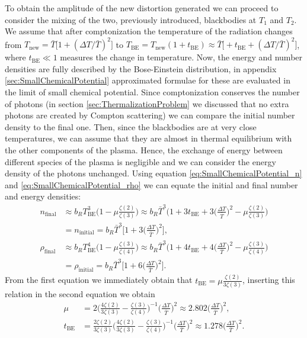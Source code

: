 To obtain the amplitude of the new distortion generated we can proceed to consider the mixing of the two, previously introduced, blackbodies at $T_1$ and $T_2$. We assume that after comptonization the temperature of the radiation changes from $T_\text{new}=\bar T\big[1+(\Delta T/\bar T)^2\big]$ to $T_\text{BE}=T_\text{new}(1+t_\text{BE})\approx\bar T\big[+t_\text{BE}+(\Delta T/\bar T)^2\big]$, where $t_\text{BE}\ll1$ measures the change in temperature. 
Now, the energy and number densities are fully described by the Bose-Einstein distribution, in appendix \ref{sec:SmallChemicalPotential} approximated formulae for these are evaluated in the limit of small chemical potential. Since comptonization conserves the number of photons (in section \ref{sec:ThermalizationProblem} we discussed that no extra photons are created by Compton scattering) we can compare the initial number density to the final one. Then, since the blackbodies are at very close temperatures, we can assume that they are almost in thermal equilibrium with the other components of the plasma. Hence, the exchange of energy between different species of the plasma is negligible and we can consider the energy density of the photons unchanged. Using equation \eqref{eq:SmallChemicalPotential_n} and \eqref{eq:SmallChemicalPotential_rho} we can equate the initial and final number and energy densities:
\begin{align*}
    n_\text{final}&\approx b_R T^3_\text{BE}\bigg(1-\mu\frac{\zeta(2)}{\zeta(3)}\bigg)\approx b_R \bar T^3\bigg(1+3t_\text{BE}+3\bigg(\frac{\Delta T}{\bar T}\bigg)^2-\mu\frac{\zeta(2)}{\zeta(3)}\bigg)\\
    &=n_\text{initial}=b_R\bar T^3\bigg[1+3\bigg(\frac{\Delta T}{\bar T}\bigg)^2\bigg],\\
    \rho_\text{final}&\approx b_R T^4_\text{BE}\bigg(1-\mu\frac{\zeta(3)}{\zeta(4)}\bigg)\approx b_R \bar T^3\bigg(1+4t_\text{BE}+4\bigg(\frac{\Delta T}{\bar T}\bigg)^2-\mu\frac{\zeta(3)}{\zeta(4)}\bigg)\\
    &=\rho_\text{initial}=b_R\bar T^3\bigg[1+6\bigg(\frac{\Delta T}{\bar T}\bigg)^2\bigg].
\end{align*}
From the first equation we immediately obtain that $t_\text{BE}= \mu\frac{\zeta(2)}{3\zeta(3)}$, inserting this relation in the second equation we obtain
\begin{align}
    \mu&=2\bigg(\frac{4\zeta(2)}{3\zeta(3)}-\frac{\zeta(3)}{\zeta(4)}\bigg)^{-1}\bigg(\frac{\Delta T}{\bar T}\bigg)^2\approx2.802\bigg(\frac{\Delta T}{\bar T}\bigg)^2,\label{eq:mu_MixingBB}\\
    t_\text{BE}&=\frac{2\zeta(2)}{3\zeta(3)}\bigg(\frac{4\zeta(2)}{3\zeta(3)}-\frac{\zeta(3)}{\zeta(4)}\bigg)^{-1}\bigg(\frac{\Delta T}{\bar T}\bigg)^2\approx1.278\bigg(\frac{\Delta T}{\bar T}\bigg)^2.\label{eq:t_BE_MixingBB}
\end{align}
